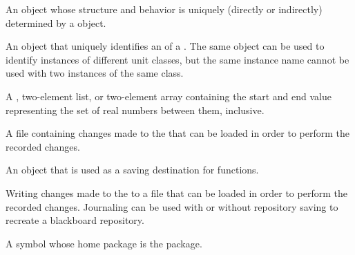 \begin{glossary-list}

\glent[instance]
%
%
%
An object whose structure and behavior is uniquely (directly or indirectly)
determined by a  object.


%
%
%
%
An object that uniquely identifies an  of a
.  The same object can be used to identify instances of
different unit classes, but the same instance name cannot be used with two
instances of the same class.


\glent[interval] 
%
%
%
A , two-element list, or two-element array containing the start
and end value representing the set of real numbers between them, inclusive.


\glent[journal] 
%
%
A file containing changes made to the  that can
be loaded in order to perform the recorded changes.


%
%
%
%
An object that is used as a saving destination for
 functions.


\glent[journaling] 
%
%
Writing changes made to the  to a file that can
be loaded in order to perform the recorded changes.  Journaling can be used
with or without repository saving to recreate a blackboard repository.


%
%
%
%
%
A symbol whose home package is the  package.


\end{glossary-list}
